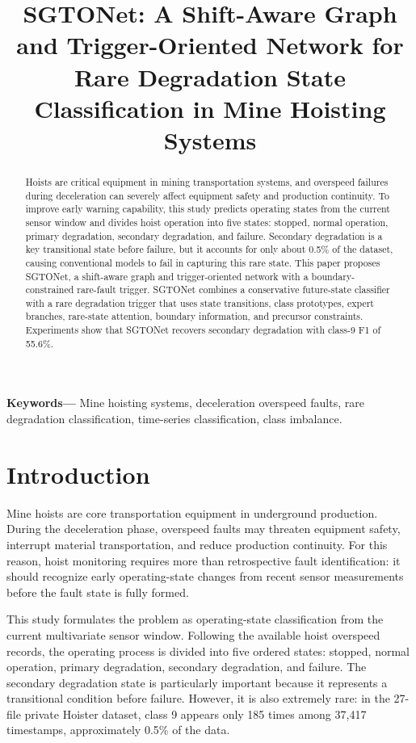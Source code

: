 \documentclass[12pt]{article}
\title{\vspace{-0.45in}SGTONet: A Shift-Aware Graph and Trigger-Oriented Network for Rare Degradation State Classification in Mine Hoisting Systems}
\author{}
\date{}
\begin{document}
        \maketitle
        \vspace{-0.55in}
        \begin{abstract}
        Hoists are critical equipment in mining transportation systems, and overspeed failures during deceleration can severely affect equipment safety and production continuity. To improve early warning capability, this study predicts operating states from the current sensor window and divides hoist operation into five states: stopped, normal operation, primary degradation, secondary degradation, and failure. Secondary degradation is a key transitional state before failure, but it accounts for only about 0.5\% of the dataset, causing conventional models to fail in capturing this rare state. This paper proposes SGTONet, a shift-aware graph and trigger-oriented network with a boundary-constrained rare-fault trigger. SGTONet combines a conservative future-state classifier with a rare degradation trigger that uses state transitions, class prototypes, expert branches, rare-state attention, boundary information, and precursor constraints. Experiments show that SGTONet recovers secondary degradation with class-9 F1 of 55.6\%.
        \end{abstract}
        \noindent\textbf{Keywords---} Mine hoisting systems, deceleration overspeed faults, rare degradation classification, time-series classification, class imbalance.
        \section{Introduction}
Mine hoists are core transportation equipment in underground production. During the deceleration phase, overspeed faults may threaten equipment safety, interrupt material transportation, and reduce production continuity. For this reason, hoist monitoring requires more than retrospective fault identification: it should recognize early operating-state changes from recent sensor measurements before the fault state is fully formed.

This study formulates the problem as operating-state classification from the current multivariate sensor window. Following the available hoist overspeed records, the operating process is divided into five ordered states: stopped, normal operation, primary degradation, secondary degradation, and failure. The secondary degradation state is particularly important because it represents a transitional condition before failure. However, it is also extremely rare: in the 27-file private Hoister dataset, class 9 appears only 185 times among 37,417 timestamps, approximately 0.5\% of the data.
\end{document}
